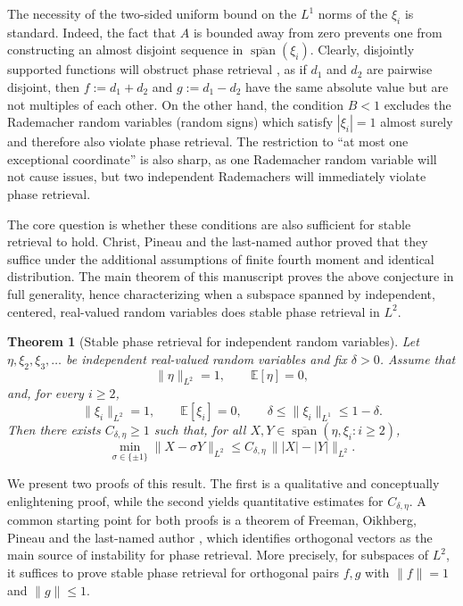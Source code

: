 \documentclass[11pt]{amsart}
\numberwithin{equation}{section}
\newtheorem{theorem}{Theorem}[section]
\theoremstyle{definition}
\theoremstyle{remark}
\newcommand{\E}{\mathbb E}
\newcommand{\Span}{\operatorname{span}}
\newcommand{\abs}[1]{\lvert #1 \rvert}
\newcommand{\norm}[1]{\lVert #1 \rVert}
\begin{document}
The necessity of the two-sided uniform bound on the $L^1$ norms of the $\xi_i$ is standard. Indeed, the fact that $A$ is bounded away from zero prevents one from constructing an almost disjoint sequence in $\overline{\Span}(\xi_i)$. Clearly, disjointly supported functions will obstruct phase retrieval \cite{FOTP}, as if $d_1$ and $d_2$ are pairwise disjoint, then $f:=d_1+d_2$ and $g:=d_1-d_2$ have the same absolute value but are not multiples of each other. On the other hand, the condition $B<1$ excludes the Rademacher
random variables (random signs) which satisfy $|\xi_i|=1$ almost surely and therefore also violate phase retrieval.
The restriction to “at most one exceptional coordinate” is also sharp, as one Rademacher random variable will not cause issues, but two independent Rademachers  will immediately violate phase retrieval. 

The core question is whether these conditions are also sufficient for stable retrieval to hold. Christ, Pineau and the last-named author \cite{christ2022examples} proved that they suffice under the additional assumptions of finite fourth moment and identical distribution. 
The main theorem of this manuscript proves the above conjecture in full generality, hence  characterizing when a subspace spanned by independent, centered, real-valued random variables does stable phase retrieval in $L^2$. 
\begin{theorem}[Stable phase retrieval for independent random variables]\label{thm:main}
Let $\eta,\xi_2,\xi_3,\dots$ be independent real-valued random variables and
fix $\delta>0$.  Assume that
\[
\norm{\eta}_{L^2}=1,
\qquad
\E[\eta]=0,
\]
and, for every $i\ge2$,
\[
\norm{\xi_i}_{L^2}=1,
\qquad
\E[\xi_i]=0,
\qquad
\delta\le \norm{\xi_i}_{L^1}\le 1-\delta.
\]
Then there exists $C_{\delta,\eta}\ge1$ such that, for all
$X,Y\in \overline{\Span}(\eta,\xi_i:i\ge2)$,
\[
\min_{\sigma\in\{\pm1\}}\norm{X-\sigma Y}_{L^2}
\le
C_{\delta,\eta}\,\norm{\abs{X}-\abs{Y}}_{L^2}.
\]
\end{theorem}

We present two proofs of this result. The first is a qualitative and conceptually enlightening proof, while the second yields quantitative estimates for $C_{\delta,\eta}$. A common starting point for both proofs is 
a theorem of Freeman, Oikhberg, Pineau and the last-named author \cite{FOTP}, which identifies orthogonal vectors as the main source of instability for phase retrieval. More precisely, for subspaces of $L^2$, it suffices to prove stable phase retrieval for orthogonal pairs $f,g$ with $\norm{f}=1$ and $\norm{g}
\leq 1$.
\end{document}
